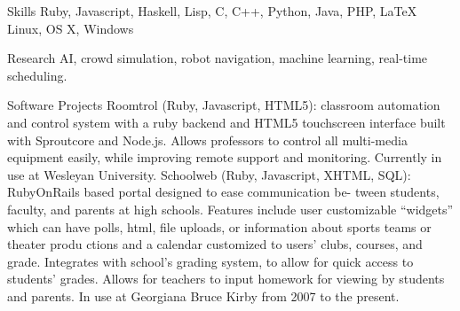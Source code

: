\documentclass{/Users/mwylde/.rvm/gems/ruby-1.9.2-p0/gems/resume-0.1.0/lib/resume/templates/resume}
\begin{document}

  \begin{category}{Skills}
       \citembullet Ruby, Javascript, Haskell, Lisp, C, C++, Python, Java, PHP, \LaTeX
\citembullet Linux, OS X, Windows
                   
  \end{category}
  \begin{category}{Research}
       \citembullet AI, crowd simulation, robot navigation, machine learning, real-time scheduling.
                   
  \end{category}
  \begin{category}{Software Projects}
       \citembullet Roomtrol (Ruby, Javascript, HTML5): classroom automation and control system with a ruby backend and HTML5 touchscreen interface built with Sproutcore and Node.js. Allows professors to control all multi-media equipment easily, while improving remote support and monitoring. Currently in use at Wesleyan University.
\citembullet Schoolweb (Ruby, Javascript, XHTML, SQL): RubyOnRails based portal designed to ease communication be- tween students, faculty, and parents at high schools. Features include user customizable “widgets” which can have polls, html, file uploads, or information about sports teams or theater produ
ctions and a calendar customized to users’ clubs, courses, and grade. Integrates with school’s grading system, to allow for quick access to students’ grades. Allows for teachers to input homework for viewing by students and parents. In use at Georgiana Bruce Kirby from 2007 to the present.
                   
  \end{category}
\end{document}
